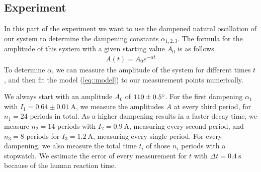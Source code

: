 \subsection{Experiment}
In this part of the experiment we want to use the dampened natural oscillation of our system to determine the dampening constants $\alpha_{1, 2, 3}$.
The formula for the amplitude of this system with a given starting value $A_0$ is  as follows.
\begin{align}
	A(t) = A_0 e^{-\alpha t}
	\label{eq::model}
\end{align} 
To determine $\alpha$, we can measure the amplitude of the system for different times $t$, and then fit the model (\ref{eq::model}) to our measurement points numerically.

We always start with an amplitude $A_0$ of $110 \pm 0.5 \degree$.
For the first dampening $\alpha_1$ with $I_1 = 0.64 \pm \SI{0.01}{\ampere}$, we measure the amplitudes $A$ at every third period, for $n_1 = 24$ periods in total.
As a higher dampening results in a faster decay time, we measure $n_2 = 14$ periods with $I_2 = \SI{0.9}{\ampere}$, measuring every second period, and $n_3 = 8$ periods for $I_3 = \SI{1.2}{\ampere}$, measuring every single period.
For every dampening, we also measure the total time $t_i$ of those $n_i$ periods with a stopwatch. We estimate the error of every measurement for $t$ with $\Delta t = \SI{0.4}{\second}$ because of the human reaction time.

